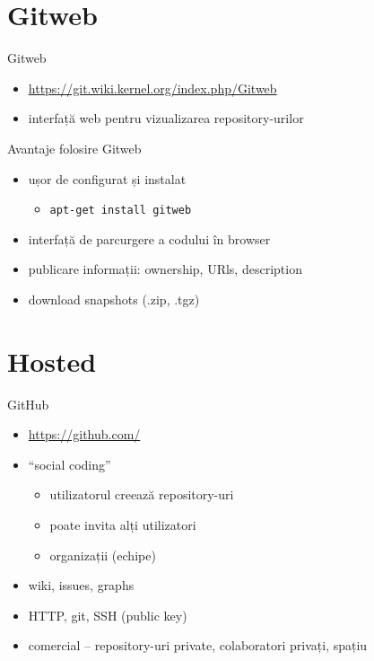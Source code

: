 \documentclass{beamer}
\begin{document}
\section{Gitweb}

\begin{frame}{Gitweb}
	\begin{itemize}
		\item \url{https://git.wiki.kernel.org/index.php/Gitweb}
		\item interfață web pentru vizualizarea repository-urilor
	\end{itemize}
\end{frame}

\begin{frame}{Avantaje folosire Gitweb}
	\begin{itemize}
		\item ușor de configurat și instalat
          \begin{itemize}
            \item \texttt{apt-get install gitweb}
          \end{itemize}
		\item interfață de parcurgere a codului în browser
        \item publicare informații: ownership, URls, description
        \item download snapshots (.zip, .tgz)
	\end{itemize}
\end{frame}

\section{Hosted}

\begin{frame}{GitHub}
  \begin{itemize}
    \item \url{https://github.com/}
    \item ``social coding''
      \begin{itemize}
        \item utilizatorul creează repository-uri
        \item poate invita alți utilizatori
        \item organizații (echipe)
      \end{itemize}
    \item wiki, issues, graphs
    \item HTTP, git, SSH (public key)
    \item comercial -- repository-uri private, colaboratori privați, spațiu
  \end{itemize}
\end{frame}
\end{document}
